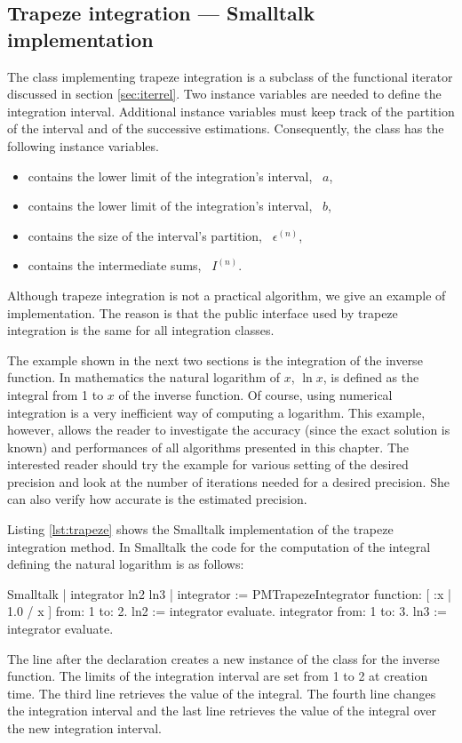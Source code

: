 \subsection{Trapeze integration --- Smalltalk implementation}
\label{sec:strapeze}
The class implementing trapeze integration is a subclass of the functional iterator discussed in
section \ref{sec:iterrel}. Two instance variables are needed to
define the integration interval. Additional instance variables
must keep track of the partition of the interval and of the
successive estimations. Consequently, the class has the following
instance variables.
\begin{itemize}
\item {} contains the lower limit of the integration's interval,
 \ie\ $a$,
\item {} contains the lower limit of the integration's interval,
 \ie\ $b$,
\item {} contains the size of the interval's partition,
 \ie\ $\epsilon^{\left(n\right)}$,
\item {} contains the intermediate sums, \ie\ $I^{\left(n\right)}$.
\end{itemize}

Although trapeze integration is not a practical algorithm, we give
an example of implementation. The reason is that the public interface used by trapeze integration is the same for all integration classes.

The example shown in the next two sections is the integration of
the inverse function. In mathematics the natural logarithm of $x$,
$\ln x$, is defined as the integral from 1 to $x$ of the inverse
function. Of course, using numerical integration is a very
inefficient way of computing a logarithm. This example, however,
allows the reader to investigate the accuracy (since the exact
solution is known) and performances of all algorithms presented in
this chapter. The interested reader should try the example for
various setting of the desired precision and look at the number of
iterations needed for a desired precision. She can also verify how
accurate is the estimated precision.

Listing \ref{lst:trapeze} shows the Smalltalk implementation of the trapeze integration method. In Smalltalk the code for the computation of the integral defining the natural logarithm is as follows:
\begin{displaycode}{Smalltalk}
| integrator ln2 ln3 |
integrator := PMTrapezeIntegrator
                 function: [ :x | 1.0 / x ] from: 1 to: 2.
ln2 := integrator evaluate.
integrator from: 1 to: 3.
ln3 := integrator evaluate.
\end{displaycode}
The line after the declaration creates a new instance of the class  for the inverse function. The limits of the integration interval are set from 1 to 2 at creation time. The
third line retrieves the value of the integral. The fourth line
changes the integration interval and the last line retrieves the
value of the integral over the new integration interval.

